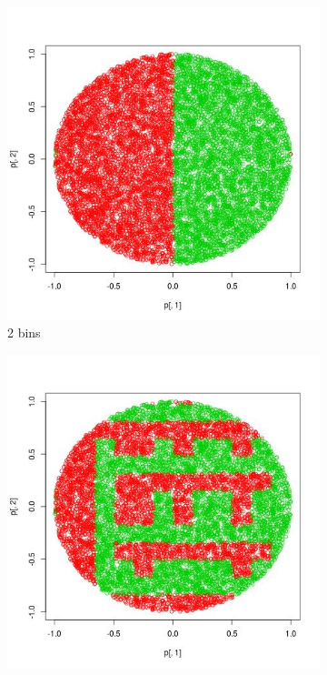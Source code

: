 \documentclass[12pt, a4paper]{article}
\begin{document}
\begin{figure}
    \centering
      ~ %
    \begin{subfigure}[b]{0.40\textwidth}
        \includegraphics[width=\textwidth]{prediccion2ea}
        \caption{2 bins}
    \end{subfigure}
    \begin{subfigure}[b]{0.40\textwidth}
        \includegraphics[width=\textwidth]{prediccion6ea}

\end{subfigure}
\end{figure}
\end{document}
